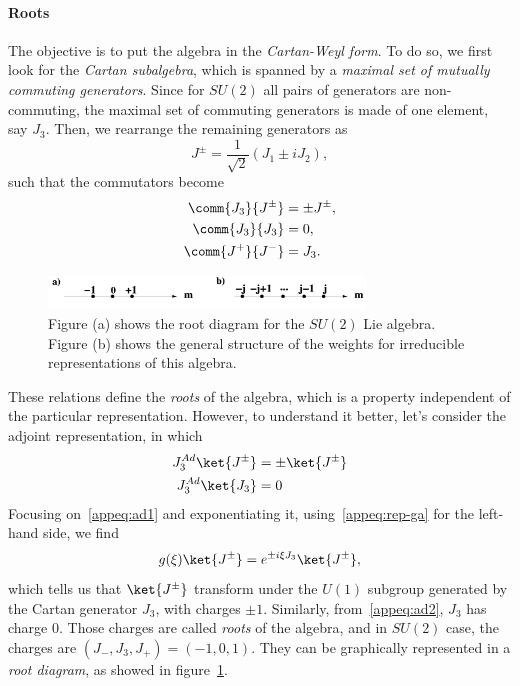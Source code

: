 \paragraph{Roots}
The objective is to put the algebra in the \emph{Cartan-Weyl form}. To do so, we first look for the \emph{Cartan subalgebra}, which is spanned by a \emph{maximal set of mutually commuting generators}. Since for $SU(2)$ all pairs of generators are non-commuting, the maximal set of commuting generators is made of one element, say $J_3$. Then, we rearrange the remaining generators as
\begin{equation}
    J^\pm = \frac{1}{\sqrt{2}} (J_1 \pm i J_2) ,
\end{equation}
such that the commutators become
\begin{subequations}
\begin{align}
    \comm{J_3}{J^\pm} &= \pm J^\pm, \\
    \comm{J_3}{J_3} &= 0 ,\\
    \comm{J^+}{J^-} &= J_3 .
\end{align}
\end{subequations}

\begin{figure}
    \centering
    \includegraphics[width=0.75\textwidth]{figures/roots.png}
    \caption{Figure (a) shows the root diagram for the $SU(2)$ Lie algebra. Figure (b) shows the general structure of the weights for irreducible representations of this algebra.}
    \label{fig:su2-root-diagram}
\end{figure}

These relations define the \emph{roots} of the algebra, which is a property independent of the particular representation. However, to understand it better, let's consider the adjoint representation, in which
\begin{subequations}
\begin{align}
    J^{Ad}_3 \ket{J^\pm} &= \pm \ket{J^\pm} \label{appeq:ad1}\\
    J_3^{Ad} \ket{J_3} &= 0 \label{appeq:ad2}\\
\end{align}
\end{subequations}
Focusing on~\eqref{appeq:ad1} and exponentiating it, using~\eqref{appeq:rep-ga} for the left-hand side, we find
\begin{equation}
    g(\xi) \ket{J^\pm} = e^{\pm i \xi J_3} \ket{J^\pm} ,
\end{equation}
which tells us that $\ket{J^\pm}$ transform under the $U(1)$ subgroup generated by the Cartan generator $J_3$, with charges $\pm 1$. Similarly, from~\eqref{appeq:ad2}, $J_3$ has charge $0$. Those charges are called \emph{roots} of the algebra, and in $SU(2)$ case, the charges are $(J_-, J_3, J_+) = (-1,0,1)$. They can be graphically represented in a \emph{root diagram}, as showed in figure~\ref{fig:su2-root-diagram}.

